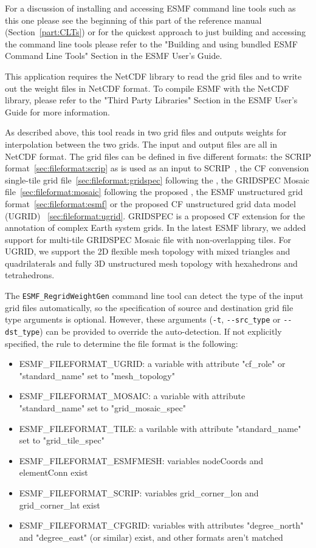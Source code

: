 For a discussion of installing and accessing ESMF command line tools such as this one please see the beginning of this part of the reference manual (Section~\ref{part:CLTs}) or for the quickest approach to just building and accessing the command line tools please refer to the "Building and using bundled ESMF Command Line Tools" Section in the ESMF User's Guide.

This application requires the NetCDF library to read the grid files and to write out the weight files in NetCDF format.  To compile ESMF with the NetCDF library, please refer to the "Third Party Libraries" Section in the ESMF User's Guide for more information.

As described above, this tool reads in
two grid files and outputs weights for interpolation
 between the two grids. The input and output files are all in NetCDF format. The grid files can be defined in five
different formats:  the SCRIP format~\ref{sec:fileformat:scrip} as is used as an input to SCRIP~\cite{ref:SCRIP}, the CF convension single-tile grid file~\ref{sec:fileformat:gridspec} following the
, the GRIDSPEC Mosaic file~\ref{sec:fileformat:mosaic} following the proposed ,  
the ESMF unstructured grid format~\ref{sec:fileformat:esmf} or the proposed CF unstructured grid data model (UGRID) ~\ref{sec:fileformat:ugrid}.  GRIDSPEC is a proposed CF extension for the annotation of complex Earth system grids.  In the latest ESMF library, we added support for multi-tile GRIDSPEC Mosaic file with non-overlapping tiles. For UGRID, we support the 2D flexible mesh topology with mixed triangles and quadrilaterals and fully 3D unstructured mesh topology with hexahedrons and tetrahedrons.  

The {\tt ESMF\_RegridWeightGen} command line tool can detect the type of the input grid files automatically, so the specification of source and destination grid file type arguments is optional. However, these arguments ({\tt -t}, {\tt \verb+--+src\_type} or {\tt \verb+--+dst\_type}) can be provided to override the auto-detection. If not explicitly specified, the rule to determine the file format is the following:

\begin{itemize}
  \item ESMF\_FILEFORMAT\_UGRID: a variable with attribute "cf\_role" or "standard\_name" set to "mesh\_topology"
  \item ESMF\_FILEFORMAT\_MOSAIC: a variable with attribute "standard\_name" set to "grid\_mosaic\_spec"
  \item ESMF\_FILEFORMAT\_TILE:  a varilable with attribute "standard\_name" set to "grid\_tile\_spec"
  \item ESMF\_FILEFORMAT\_ESMFMESH: variables nodeCoords and elementConn exist
  \item ESMF\_FILEFORMAT\_SCRIP:  variables grid\_corner\_lon and grid\_corner\_lat exist
  \item ESMF\_FILEFORMAT\_CFGRID: variables with attributes "degree\_north" and "degree\_east" (or similar) exist, and other formats aren't matched
\end{itemize}


